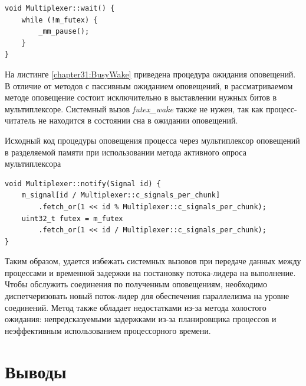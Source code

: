 \begin{lstlisting}[float=!h,caption={Исходный код процедуры ожидания оповещений через мультиплексор оповещений в разделяемой памяти при использовании метода активного опроса мультиплексора},label={chapter31:BusyWait},frame=tlrb]
void Multiplexer::wait() {
	while (!m_futex) {
		_mm_pause();
	}
}
\end{lstlisting}

На листинге \ref{chapter31:BusyWake} приведена процедура ожидания оповещений. В отличие от методов с пассивным ожиданием оповещений, в рассматриваемом методе оповещение состоит исключительно в выставлении нужных битов в мультиплексоре. Системный вызов \textit{futex\_wake} также не нужен, так как процесс-читатель не находится в состоянии сна в ожидании оповещений.

\begin{algorithm}[!h]
\caption{Исходный код процедуры оповещения процесса через мультиплексор оповещений в разделяемой памяти при использовании метода активного опроса мультиплексора}
\label{chapter31:BusyWake}
\begin{lstlisting}[frame=tlrb]
void Multiplexer::notify(Signal id) {
	m_signal[id / Multiplexer::c_signals_per_chunk]
		.fetch_or(1 << id % Multiplexer::c_signals_per_chunk);
	uint32_t futex = m_futex
		.fetch_or(1 << id / Multiplexer::c_signals_per_chunk);
}
\end{lstlisting}
\end{algorithm}

Таким образом, удается избежать системных вызовов при передаче данных между процессами и временной задержки на постановку потока-лидера на выполнение. Чтобы обслужить соединения по полученным оповещениям, необходимо диспетчеризовать новый поток-лидер для обеспечения параллелизма на уровне соединений.
Метод также обладает недостатками из-за метода холостого ожидания: непредсказуемыми задержками из-за планировщика процессов и неэффективным использованием процессорного времени.

\section{Выводы}

